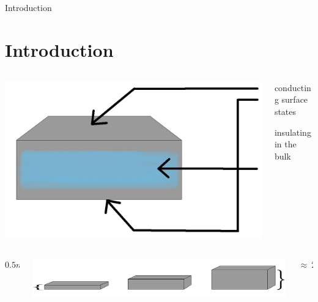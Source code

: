\begin{frame}{Introduction}\section{Introduction}
	\begin{columns} \hfill
		\begin{column}{0.5\linewidth} \centering
			\includegraphics[width=.7\linewidth]{extrabilder_fuer_vortrag/Introduction1.jpg}
		\end{column}
		\begin{column}{0.5\linewidth} 
			conducting surface states
			
			\vspace{23px}
			insulating in the bulk
			
			\vspace{28pt}
		\end{column}\hfill
	\end{columns}
	
	\begin{columns}
		\begin{column}{0.1\linewidth}
			\vspace{9px}
			$0.5 \unit{nm}~\approx$
		\end{column}
		\begin{column}{0.8\linewidth}
			\includegraphics[width=\linewidth]{extrabilder_fuer_vortrag/Introduction2.jpg}
		\end{column}
			\hspace{-15px} 
		\begin{column}{0.1\linewidth}
			\vspace{.2px}
			$\approx~2.7 \unit{nm}$
		\end{column}
	\end{columns}

\end{frame}

